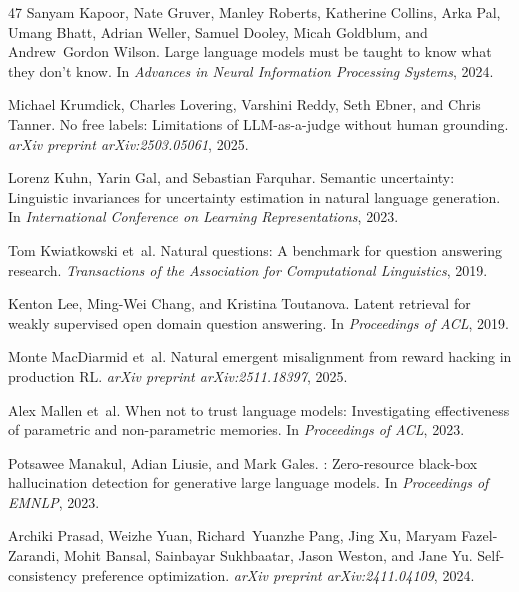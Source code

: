 \documentclass[11pt,a4paper,twocolumn]{article}
\begin{document}
\begin{thebibliography}{47}
Sanyam Kapoor, Nate Gruver, Manley Roberts, Katherine Collins, Arka Pal, Umang
  Bhatt, Adrian Weller, Samuel Dooley, Micah Goldblum, and Andrew~Gordon
  Wilson.
\newblock Large language models must be taught to know what they don't know.
\newblock In \emph{Advances in Neural Information Processing Systems}, 2024.

Michael Krumdick, Charles Lovering, Varshini Reddy, Seth Ebner, and Chris
  Tanner.
\newblock No free labels: Limitations of {LLM}-as-a-judge without human
  grounding.
\newblock \emph{arXiv preprint arXiv:2503.05061}, 2025.

Lorenz Kuhn, Yarin Gal, and Sebastian Farquhar.
\newblock Semantic uncertainty: Linguistic invariances for uncertainty
  estimation in natural language generation.
\newblock In \emph{International Conference on Learning Representations}, 2023.

Tom Kwiatkowski et~al.
\newblock Natural questions: A benchmark for question answering research.
\newblock \emph{Transactions of the Association for Computational Linguistics},
  2019.

Kenton Lee, Ming-Wei Chang, and Kristina Toutanova.
\newblock Latent retrieval for weakly supervised open domain question
  answering.
\newblock In \emph{Proceedings of ACL}, 2019.

Monte MacDiarmid et~al.
\newblock Natural emergent misalignment from reward hacking in production {RL}.
\newblock \emph{arXiv preprint arXiv:2511.18397}, 2025.

Alex Mallen et~al.
\newblock When not to trust language models: Investigating effectiveness of
  parametric and non-parametric memories.
\newblock In \emph{Proceedings of ACL}, 2023.

Potsawee Manakul, Adian Liusie, and Mark Gales.
: Zero-resource black-box hallucination detection for
  generative large language models.
\newblock In \emph{Proceedings of EMNLP}, 2023.

Archiki Prasad, Weizhe Yuan, Richard~Yuanzhe Pang, Jing Xu, Maryam
  Fazel-Zarandi, Mohit Bansal, Sainbayar Sukhbaatar, Jason Weston, and Jane Yu.
\newblock Self-consistency preference optimization.
\newblock \emph{arXiv preprint arXiv:2411.04109}, 2024.


\end{thebibliography}
\end{document}
